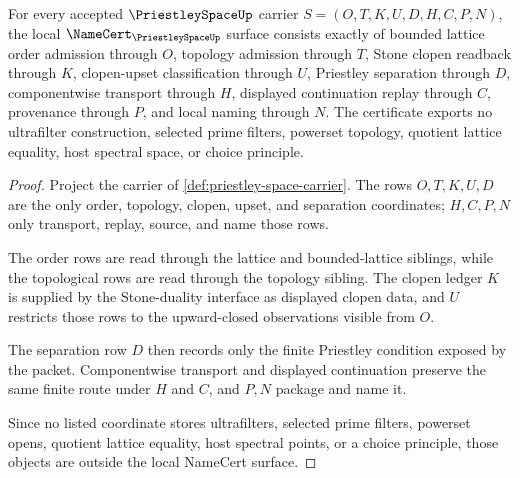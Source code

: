 \begin{theorem}
\label{thm:priestley-space-namecert-obligations}
For every accepted $\PriestleySpaceUp$ carrier $S=(O,T,K,U,D,H,C,P,N)$, the local $\NameCert_{\PriestleySpaceUp}$ surface consists exactly of bounded lattice order admission through $O$, topology admission through $T$, Stone clopen readback through $K$, clopen-upset classification through $U$, Priestley separation through $D$, componentwise transport through $H$, displayed continuation replay through $C$, provenance through $P$, and local naming through $N$. The certificate exports no ultrafilter construction, selected prime filters, powerset topology, quotient lattice equality, host spectral space, or choice principle.
\end{theorem}
\begin{proof}
Project the carrier of \autoref{def:priestley-space-carrier}. The rows $O,T,K,U,D$ are the only order, topology, clopen, upset, and separation coordinates; $H,C,P,N$ only transport, replay, source, and name those rows.

The order rows are read through the lattice and bounded-lattice siblings, while the topological rows are read through the topology sibling. The clopen ledger $K$ is supplied by the Stone-duality interface as displayed clopen data, and $U$ restricts those rows to the upward-closed observations visible from $O$.

The separation row $D$ then records only the finite Priestley condition exposed by the packet. Componentwise transport and displayed continuation preserve the same finite route under $H$ and $C$, and $P,N$ package and name it.

Since no listed coordinate stores ultrafilters, selected prime filters, powerset opens, quotient lattice equality, host spectral points, or a choice principle, those objects are outside the local NameCert surface.
\end{proof}

